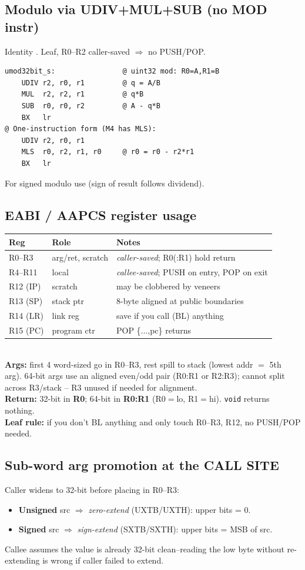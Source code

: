 \subsection{Modulo via UDIV+MUL+SUB (no MOD instr)}
Identity . Leaf, R0--R2 caller-saved $\Rightarrow$ no PUSH/POP.
\begin{lstlisting}
umod32bit_s:                @ uint32 mod: R0=A,R1=B
    UDIV r2, r0, r1         @ q = A/B
    MUL  r2, r2, r1         @ q*B
    SUB  r0, r0, r2         @ A - q*B
    BX   lr
@ One-instruction form (M4 has MLS):
    UDIV r2, r0, r1
    MLS  r0, r2, r1, r0     @ r0 = r0 - r2*r1
    BX   lr
\end{lstlisting}
For signed modulo use  (sign of result follows dividend).

\subsection{EABI / AAPCS register usage}
\begin{tabular}{@{}llp{3.4cm}@{}}
\toprule
Reg & Role & Notes \\
\midrule
R0--R3 & arg/ret, scratch & \emph{caller-saved}; R0(:R1) hold return \\
R4--R11 & local & \emph{callee-saved}; PUSH on entry, POP on exit \\
R12 (IP) & scratch & may be clobbered by veneers \\
R13 (SP) & stack ptr & 8-byte aligned at public boundaries \\
R14 (LR) & link reg & save if you call (BL) anything \\
R15 (PC) & program ctr & POP \{...,pc\} returns \\
\bottomrule
\end{tabular}\\
\textbf{Args:} first 4 word-sized go in R0--R3, rest spill to stack
(lowest addr $=$ 5th arg). 64-bit args use an aligned even/odd pair
(R0:R1 or R2:R3); cannot split across R3/stack -- R3 unused if needed
for alignment.\\
\textbf{Return:} 32-bit in \textbf{R0}; 64-bit in \textbf{R0:R1}
(R0$=$lo, R1$=$hi). \texttt{void} returns nothing.\\
\textbf{Leaf rule:} if you don't BL anything and only touch
R0--R3, R12, no PUSH/POP needed.

\subsection{Sub-word arg promotion at the CALL SITE}
Caller widens  to 32-bit before placing in R0--R3:
\begin{itemize}
\item \textbf{Unsigned} src $\Rightarrow$ \emph{zero-extend} (UXTB/UXTH): upper bits = 0.
\item \textbf{Signed} src $\Rightarrow$ \emph{sign-extend} (SXTB/SXTH): upper bits = MSB of src.
\end{itemize}
Callee assumes the value is already 32-bit clean--reading the low byte without re-extending is wrong if caller failed to extend.

